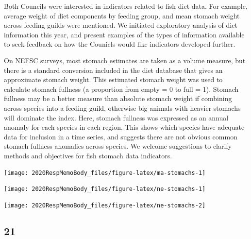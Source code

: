 \documentclass[
  10pt,
]{article}
\let\origfigure\figure
\let\endorigfigure\endfigure
\renewenvironment{figure}[1][2] {
    \expandafter\origfigure\expandafter[H]
} {
    \endorigfigure
}
\begin{document}
Both Councils were interested in indicators related to fish diet data.
For example, average weight of diet components by feeding group, and
mean stomach weight across feeding guilds were mentioned. We initiated
exploratory analysis of diet information this year, and present examples
of the types of information available to seek feedback on how the
Counicls would like indicators developed further.

On NEFSC surveys, most stomach estimates are taken as a volume measure,
but there is a standard conversion included in the diet database that
gives an approximate stomach weight. This estimated stomach weight was
used to calculate stomach fullness (a proportion from empty = 0 to full
= 1). Stomach fullness may be a better measure than absolute stomach
weight if combining across species into a feeding guild, otherwise big
animals with heavier stomachs will dominate the index. Here, stomach
fullness was expressed as an annual anomaly for each species in each
region. This shows which species have adequate data for inclusion in a
time series, and suggests there are not obvious common stomach fullness
anomalies across species. We welcome suggestions to clarify methods and
objectives for fish stomach data indicators.

\begin{figure}

{\centering \texttt{[image: 2020RespMemoBody\_files/figure-latex/ma-stomachs-1]} 

}

\caption{Stomach fullness anomaly in the Mid-Atlantic Bight.}\label{fig:ma-stomachs}
\end{figure}

\begin{figure}

{\centering \texttt{[image: 2020RespMemoBody\_files/figure-latex/ne-stomachs-1]} 

}

\caption{ Stomach Fullness Anomaly in New England.}\label{fig:ne-stomachs1}
\end{figure}
\begin{figure}

{\centering \texttt{[image: 2020RespMemoBody\_files/figure-latex/ne-stomachs-2]} 

}

\caption{ Stomach Fullness Anomaly in New England.}\label{fig:ne-stomachs2}
\end{figure}

\hypertarget{section-20}{%
\subsection{21}\label{section-20}}
\end{document}
